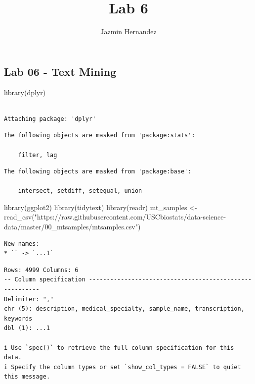 \documentclass[
  letterpaper,
  DIV=11,
  numbers=noendperiod]{scrartcl}
\title{Lab 6}
\author{Jazmin Hernandez}
\date{}
\newenvironment{Shaded}{\begin{snugshade}}{\end{snugshade}}
\newcommand{\FunctionTok}[1]{\textcolor[rgb]{0.28,0.35,0.67}{#1}}
\newcommand{\NormalTok}[1]{\textcolor[rgb]{0.00,0.23,0.31}{#1}}
\newcommand{\OtherTok}[1]{\textcolor[rgb]{0.00,0.23,0.31}{#1}}
\newcommand{\StringTok}[1]{\textcolor[rgb]{0.13,0.47,0.30}{#1}}
\begin{document}
\maketitle


\subsection{Lab 06 - Text Mining}\label{lab-06---text-mining}

\begin{Shaded}
\begin{Highlighting}[]
\FunctionTok{library}\NormalTok{(dplyr)}
\end{Highlighting}
\end{Shaded}

\begin{verbatim}

Attaching package: 'dplyr'
\end{verbatim}

\begin{verbatim}
The following objects are masked from 'package:stats':

    filter, lag
\end{verbatim}

\begin{verbatim}
The following objects are masked from 'package:base':

    intersect, setdiff, setequal, union
\end{verbatim}

\begin{Shaded}
\begin{Highlighting}[]
\FunctionTok{library}\NormalTok{(ggplot2)}
\FunctionTok{library}\NormalTok{(tidytext)}
\FunctionTok{library}\NormalTok{(readr)}
\NormalTok{mt\_samples }\OtherTok{\textless{}{-}} \FunctionTok{read\_csv}\NormalTok{(}\StringTok{"https://raw.githubusercontent.com/USCbiostats/data{-}science{-}data/master/00\_mtsamples/mtsamples.csv"}\NormalTok{)}
\end{Highlighting}
\end{Shaded}

\begin{verbatim}
New names:
* `` -> `...1`
\end{verbatim}

\begin{verbatim}
Rows: 4999 Columns: 6
-- Column specification --------------------------------------------------------
Delimiter: ","
chr (5): description, medical_specialty, sample_name, transcription, keywords
dbl (1): ...1

i Use `spec()` to retrieve the full column specification for this data.
i Specify the column types or set `show_col_types = FALSE` to quiet this message.
\end{verbatim}
\end{document}

